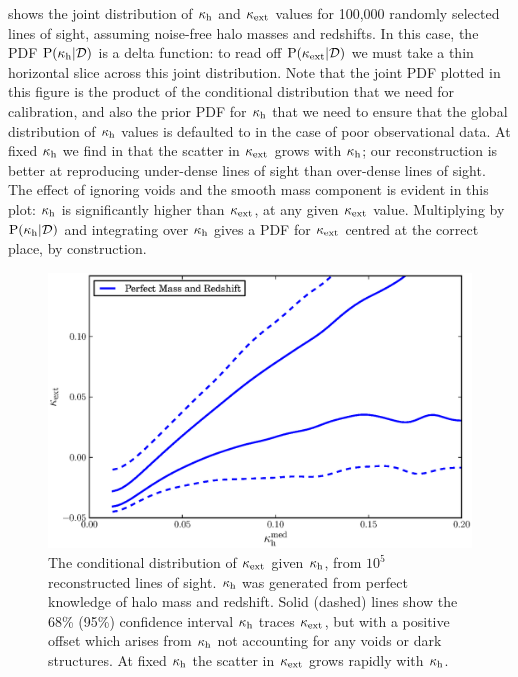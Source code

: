 \documentclass[useAMS,usenatbib]{mn2e}
\begin{document}
 shows the joint distribution of $\kappa_{\rm h}$ and $\kappa_{\rm ext}$
values for 100,000 randomly selected \MS lines of sight, assuming noise-free
halo masses and redshifts. In this case, the PDF ${\rm P}(\kappa_{\rm h}|{\mathcal{D}})$ is a
delta function: to read off ${\rm P}(\kappa_{\rm ext}|{\mathcal{D}})$ we must take a thin horizontal
slice across this joint distribution. Note that the joint PDF plotted in this
figure is the product of  the conditional distribution that we need for
calibration, and also the prior PDF for $\kappa_{\rm h}$ that we need to ensure that
the global distribution of $\kappa_{\rm h}$ values is defaulted to in the case of
poor observational data. At fixed $\kappa_{\rm h}$ we find in 
that the scatter in $\kappa_{\rm ext}$ grows with $\kappa_{\rm h}$; our reconstruction is
better at reproducing under-dense lines of sight than over-dense lines of sight.
The effect of ignoring voids and the smooth mass component is evident in this
plot: $\kappa_{\rm h}$ is significantly higher than $\kappa_{\rm ext}$, at any given $\kappa_{\rm ext}$
value. Multiplying by ${\rm P}(\kappa_{\rm h}|{\mathcal{D}})$ and integrating over $\kappa_{\rm h}$
gives a PDF for $\kappa_{\rm ext}$ centred at the correct place, by construction.

\begin{figure}
\includegraphics[width=\columnwidth]{figs/cornerplot.eps}
\caption[Biased?]{The conditional distribution of 
$\kappa_{\rm ext}$ given $\kappa_{\rm h}$, from $10^5$ reconstructed lines of
sight. $\kappa_{\rm h}$ was generated from perfect knowledge of halo mass and redshift. Solid (dashed) lines show the 68\% (95\%) confidence interval $\kappa_{\rm h}$ traces $\kappa_{\rm ext}$, but with a positive offset which arises from
$\kappa_{\rm h}$ not accounting for any voids or dark structures.
 At fixed $\kappa_{\rm h}$ the scatter in $\kappa_{\rm ext}$ grows rapidly with $\kappa_{\rm h}$.}
\label{fig:jointkh-k}
\end{figure}
\end{document}
